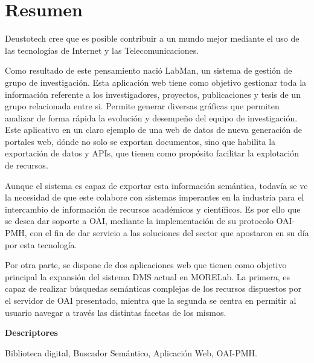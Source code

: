 \chapter*{Resumen}

Deustotech cree que es posible contribuir a un mundo mejor mediante el uso de
las tecnologías de Internet y las Telecomunicaciones.

Como resultado de este pensamiento nació LabMan, un sistema de gestión de grupo
de investigación. Esta aplicación web tiene como objetivo gestionar toda la
información referente a los investigadores, proyectos, publicaciones y tesis de un grupo relacionada entre si. Permite generar diversas gráficas que permiten analizar de forma rápida la evolución y desempeño del equipo de investigación.
Este aplicativo en un claro ejemplo de una web de datos de nueva generación de
portales web, dónde no solo se exportan documentos, sino que habilita la
exportación de datos y APIs, que tienen como propósito facilitar la explotación
de recursos.

Aunque el sistema es capaz de exportar esta información semántica, todavía se ve la necesidad de que este colabore con  sistemas imperantes en la industria para el intercambio de información de recursos académicos y científicos.
Es por ello que se desea dar soporte a OAI, mediante la implementación de su
protocolo OAI-PMH, con el fin de dar servicio a las soluciones del sector que
apostaron en su día por esta tecnología.

Por otra parte, se dispone de dos aplicaciones web que tienen como objetivo
principal la expansión del sistema DMS actual en MORELab. La primera, es capaz
de realizar búsquedas semánticas complejas de los recursos dispuestos por el
servidor de OAI presentado, mientra que la segunda se centra en permitir al
usuario navegar a través las distintas facetas de los mismos.

\vspace{2em}

{\Large\bfseries\sectionfont Descriptores}
\vspace{3\medskipamount}

Biblioteca digital, Buscador Semántico, Aplicación Web, OAI-PMH.